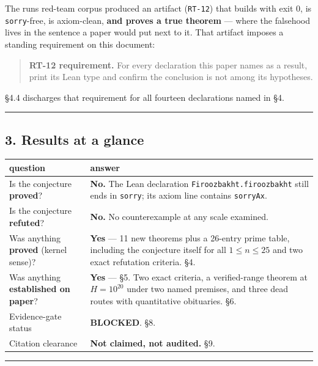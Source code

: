 \documentclass[
  a4paper,
  11pt]{article}
\begin{document}
The run\textquotesingle s red-team corpus produced an artifact
(\texttt{RT-12}) that builds with exit 0, is \texttt{sorry}-free, is
axiom-clean, \textbf{and proves a true theorem} --- where the falsehood
lives in the sentence a paper would put next to it. That artifact
imposes a standing requirement on this document:

\begin{quote}
\textbf{RT-12 requirement.} For every declaration this paper names as a
result, print its Lean type and confirm the conclusion is not among its
hypotheses.
\end{quote}

§4.4 discharges that requirement for all fourteen declarations named in
§4.

\begin{center}\rule{0.5\linewidth}{0.5pt}\end{center}

\subsection{3. Results at a glance}\label{3-results-at-a-glance}

\begin{longtable}[]{@{}ll@{}}
\toprule\noalign{}
question & answer \\
\midrule\noalign{}
\endhead
\bottomrule\noalign{}
\endlastfoot
Is the conjecture \textbf{proved}? & \textbf{No.} The Lean declaration
\texttt{Firoozbakht.firoozbakht} still ends in \texttt{sorry}; its axiom
line contains \texttt{sorryAx}. \\
Is the conjecture \textbf{refuted}? & \textbf{No.} No counterexample at
any scale examined. \\
Was anything \textbf{proved} (kernel sense)? & \textbf{Yes} --- 11 new
theorems plus a 26-entry prime table, including the conjecture itself
for all \(1 \le n \le 25\) and two exact refutation criteria. §4. \\
Was anything \textbf{established on paper}? & \textbf{Yes} --- §5. Two
exact criteria, a verified-range theorem at \(H = 10^{20}\) under two
named premises, and three dead routes with quantitative obituaries.
§6. \\
Evidence-gate status & \textbf{BLOCKED}. §8. \\
Citation clearance & \textbf{Not claimed, not audited.} §9. \\
\end{longtable}

\begin{center}\rule{0.5\linewidth}{0.5pt}\end{center}
\end{document}

